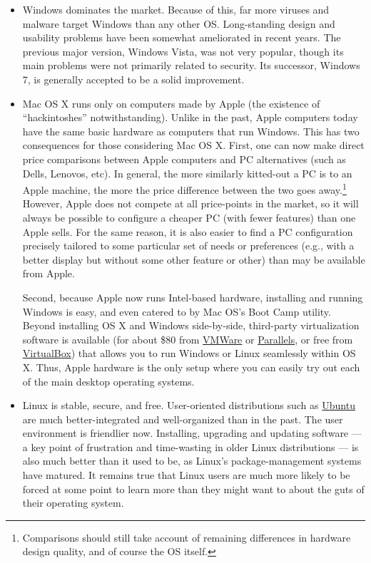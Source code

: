 \documentclass[11pt,article,oneside]{memoir}
\begin{document}
\begin{itemize}
\item Windows dominates the market. Because of this, far more viruses and
  malware target Windows than any other OS. Long-standing design and
  usability problems have been somewhat ameliorated in recent
  years. The previous major version, Windows Vista, was not very
  popular, though its main problems were not primarily related to
  security. Its successor, Windows 7, is generally accepted to be a
  solid improvement.
\item Mac OS X runs only on computers made by Apple (the existence of
  ``hackintoshes'' notwithstanding). Unlike in the past, Apple
  computers today have the same basic hardware as computers that run
  Windows. This has two consequences for those considering Mac OS
  X. First, one can now make direct price comparisons between Apple
  computers and PC alternatives (such as Dells, Lenovos, etc). In
  general, the more similarly kitted-out a PC is to an Apple machine,
  the more the price difference between the two goes
  away.\footnote{Comparisons should still take account of remaining
    differences in hardware design quality, and of course the OS
    itself. } However, Apple does not compete at all price-points in
  the market, so it will always be possible to configure a cheaper PC
  (with fewer features) than one Apple sells. For the same reason, it
  is also easier to find a PC configuration precisely tailored to some
  particular set of needs or preferences (e.g., with a better display
  but without some other feature or other) than may be available from
  Apple.

  Second, because Apple now runs Intel-based hardware, installing and
  running Windows is easy, and even catered to by Mac OS's Boot Camp
  utility. Beyond installing OS X and Windows side-by-side,
  third-party virtualization software is available (for about \$80
  from \href{http://www.vmware.com/products/fusion/}{VMWare} or
  \href{http://www.parallels.com/}{Parallels}, or free from
  \href{http://www.virtualbox.org/}{VirtualBox}) that allows you to
  run Windows or Linux seamlessly within OS X. Thus, Apple hardware is
  the only setup where you can easily try out each of the main desktop
  operating systems.
\item Linux is stable, secure, and free. User-oriented distributions
  such as \href{http://www.ubuntu.com/}{Ubuntu} are much
  better-integrated and well-organized than in the past. The user
  environment is friendlier now. Installing, upgrading and updating
  software --- a key point of frustration and time-wasting in older
  Linux distributions --- is also much better than it used to be, as
  Linux's package-management systems have matured. It remains true
  that Linux users are much more likely to be forced at some point to
  learn more than they might want to about the guts of their operating
  system.
\end{itemize}
\end{document}
